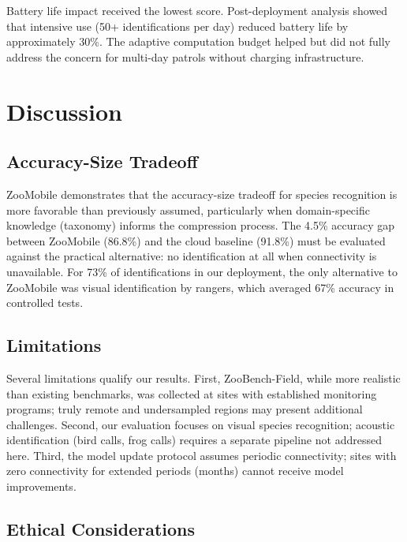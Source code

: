 \documentclass[11pt,a4paper]{article}
\begin{document}
Battery life impact received the lowest score.
Post-deployment analysis showed that intensive use (50+ identifications per day) reduced battery life by approximately 30\%.
The adaptive computation budget helped but did not fully address the concern for multi-day patrols without charging infrastructure.

\section{Discussion}
\label{sec:discussion}

\subsection{Accuracy-Size Tradeoff}

ZooMobile demonstrates that the accuracy-size tradeoff for species recognition is more favorable than previously assumed, particularly when domain-specific knowledge (taxonomy) informs the compression process.
The 4.5\% accuracy gap between ZooMobile (86.8\%) and the cloud baseline (91.8\%) must be evaluated against the practical alternative: no identification at all when connectivity is unavailable.
For 73\% of identifications in our deployment, the only alternative to ZooMobile was visual identification by rangers, which averaged 67\% accuracy in controlled tests.

\subsection{Limitations}

Several limitations qualify our results.
First, ZooBench-Field, while more realistic than existing benchmarks, was collected at sites with established monitoring programs; truly remote and undersampled regions may present additional challenges.
Second, our evaluation focuses on visual species recognition; acoustic identification (bird calls, frog calls) requires a separate pipeline not addressed here.
Third, the model update protocol assumes periodic connectivity; sites with zero connectivity for extended periods (months) cannot receive model improvements.

\subsection{Ethical Considerations}
\end{document}

